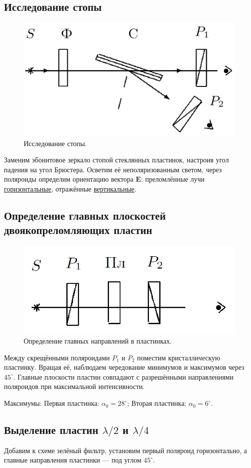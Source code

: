 \subsection*{Исследование стопы}
\begin{figure}[h]
    \centering
	\includegraphics[width=0.5\linewidth]{images/Screenshot_2.png}
	\caption{Исследование стопы.}
	\label{pic:2}
\end{figure}

Заменим эбонитовое зеркало стопой стеклянных пластинок, настроив угол падения на угол Брюстера. Осветим её неполяризованным светом, через поляроиды определим ориентацию вектора $ \mathbf{E} $: преломлённые лучи \underline{горизонтальные}, отражённые \underline{вертикальные}.


\subsection*{Определение главных плоскостей двоякопреломляющих пластин}
\begin{figure}[h]
\centering
	\includegraphics[width=0.5\linewidth]{images/Screenshot_3.png}
	\caption{Определение главных направлений в пластинках.}
	\label{pic:3}
\end{figure}

Между скрещёнными поляроидами $ P_1 $ и $ P_2 $ поместим кристаллическую пластинку. Вращая её, наблюдаем чередование минимумов и максимумов через $ 45^\circ $. Главные плоскости пластин совпадают с разрешёнными направлениями поляроидов при максимальной интенсивности.  

Максимумы: Первая пластинка: $ \alpha_0 = 28^\circ $; Вторая пластинка: $ \alpha_0 = 6^\circ $.

\subsection*{Выделение пластин $ \lambda / 2 $ и $ \lambda / 4 $}
Добавим к схеме зелёный фильтр, установим первый поляроид горизонтально, а главные направления пластинки — под углом $ 45^\circ $.  

